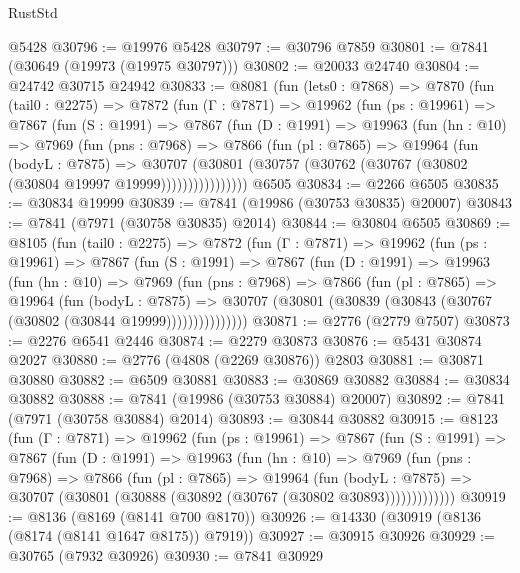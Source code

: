 \begin{lexlean}{RustStd}
\begin{coremodule}
{\begin{coremodule}
{{{{{{{{{{{{{{{{{{{{{{{{{{{{{{{{{{{{{{{{{{{{{{{{{{{{{{    @5428
@30796 := @19976 @5428
@30797 := @30796 @7859
@30801 := @7841 (@30649 (@19973 (@19975 @30797)))
@30802 := @20033 @24740
@30804 := @24742 @30715 @24942
@30833 := @8081
    (fun (lets0 : @7868) =>
    @7870
      (fun (tail0 : @2275) =>
      @7872
        (fun (Γ : @7871) =>
        @19962
          (fun (ps : @19961) =>
          @7867
            (fun (S : @1991) =>
            @7867
              (fun (D : @1991) =>
              @19963
                (fun (hn : @10) =>
                @7969
                  (fun (pns : @7968) =>
                  @7866
                    (fun (pl : @7865) =>
                    @19964
                      (fun (bodyL : @7875) =>
                      @30707
                        (@30801
                          (@30757 (@30762 (@30767 (@30802 (@30804 @19997 @19999))))))))))))))))
    @6505
@30834 := @2266 @6505
@30835 := @30834 @19999
@30839 := @7841 (@19986 (@30753 @30835) @20007)
@30843 := @7841 (@7971 (@30758 @30835) @2014)
@30844 := @30804 @6505
@30869 := @8105
    (fun (tail0 : @2275) =>
    @7872
      (fun (Γ : @7871) =>
      @19962
        (fun (ps : @19961) =>
        @7867
          (fun (S : @1991) =>
          @7867
            (fun (D : @1991) =>
            @19963
              (fun (hn : @10) =>
              @7969
                (fun (pns : @7968) =>
                @7866
                  (fun (pl : @7865) =>
                  @19964
                    (fun (bodyL : @7875) =>
                    @30707 (@30801 (@30839 (@30843 (@30767 (@30802 (@30844 @19999)))))))))))))))
@30871 := @2776 (@2779 @7507)
@30873 := @2276 @6541 @2446
@30874 := @2279 @30873
@30876 := @5431 @30874 @2027
@30880 := @2776 (@4808 (@2269 @30876)) @2803
@30881 := @30871 @30880
@30882 := @6509 @30881
@30883 := @30869 @30882
@30884 := @30834 @30882
@30888 := @7841 (@19986 (@30753 @30884) @20007)
@30892 := @7841 (@7971 (@30758 @30884) @2014)
@30893 := @30844 @30882
@30915 := @8123
    (fun (Γ : @7871) =>
    @19962
      (fun (ps : @19961) =>
      @7867
        (fun (S : @1991) =>
        @7867
          (fun (D : @1991) =>
          @19963
            (fun (hn : @10) =>
            @7969
              (fun (pns : @7968) =>
              @7866
                (fun (pl : @7865) =>
                @19964
                  (fun (bodyL : @7875) =>
                  @30707 (@30801 (@30888 (@30892 (@30767 (@30802 @30893)))))))))))))
@30919 := @8136 (@8169 (@8141 @700 @8170))
@30926 := @14330 (@30919 (@8136 (@8174 (@8141 @1647 @8175)) @7919))
@30927 := @30915 @30926
@30929 := @30765 (@7932 @30926)
@30930 := @7841 @30929
}}}}}}}}}}}}}}}}}}}}}}}}}}}}}}}}}}}}}}}}}}}}}}}}}}}}}}
\end{coremodule}}
\end{coremodule}
\end{lexlean}
